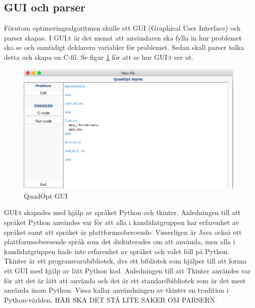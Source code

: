 \subsection{GUI och parser}
Förutom optimeringsalgoritmen skulle ett GUI (Graphical User Interface) och parser skapas. I GUI:t är det menat att användaren ska fylla in hur problemet ska se och samtidigt deklarera variabler för problemet. Sedan skall parser tolka detta och skapa en C-fil. Se figur \ref{fig:quadoptgui} för att se hur GUI:t ser ut.
\begin{figure}
\centerline{\includegraphics[scale=0.58]{grafik/QuadOptGUI}}
\caption{QuadOpt GUI}
\label{fig:quadoptgui}
\end{figure}
GUI:t skapades med hjälp av språket Python och tkinter. Anledningen till att språket Python användes var för att alla i kandidatgruppen har erfarenhet av språket samt att språket är plattformsoberoende. Visserligen är Java också ett plattformsoberoende språk som det diskuterades om att använda, men alla i kandidatgruppen hade inte erfarenhet av språket och valet föll på Python.
\newline
\newline
Tkinter är ett programvarubibliotek, dvs ett bibliotek som hjälper till att forma ett GUI med hjälp av lätt Python kod. Anledningen till att Tkinter användes var för att det är lätt att använda och det är ett standardbibliotek som är det mest använda inom Python. Vissa kallar användningen av tkinter en tradition i Python-världen.
\newline
\newline
HÄR SKA DET STÅ LITE SAKER OM PARSERN. 

